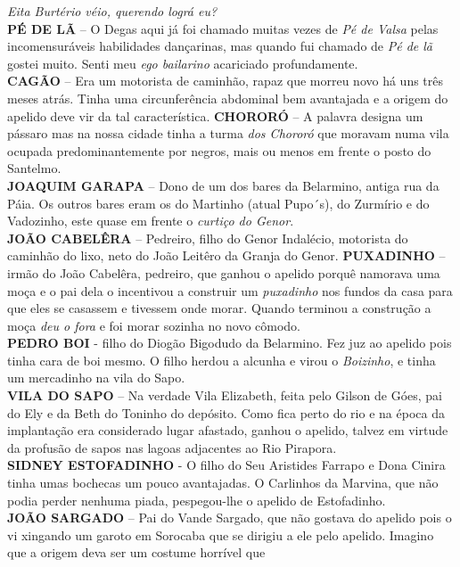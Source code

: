 \documentclass[12pt,brazil,]{book}
\begin{document}
\emph{Eita Burtério véio, querendo lográ eu?}\\
\textbf{PÉ DE LÃ} -- O Degas aqui já foi chamado muitas vezes de
\emph{Pé de Valsa} pelas incomensuráveis habilidades dançarinas, mas
quando fui chamado de \emph{Pé de lã} gostei muito. Senti meu \emph{ego
bailarino} acariciado profundamente.\\
\textbf{CAGÃO} -- Era um motorista de caminhão, rapaz que morreu novo há
uns três meses atrás. Tinha uma circunferência abdominal bem avantajada
e a origem do apelido deve vir da tal característica. \textbf{CHORORÓ}
-- A palavra designa um pássaro mas na nossa cidade tinha a turma
\emph{dos Chororó} que moravam numa vila ocupada predominantemente por
negros, mais ou menos em frente o posto do Santelmo.\\
\textbf{JOAQUIM GARAPA} -- Dono de um dos bares da Belarmino, antiga rua
da Páia. Os outros bares eram os do Martinho (atual Pupo´s), do Zurmírio
e do Vadozinho, este quase em frente o \emph{curtiço do Genor}.\\
\textbf{JOÃO CABELÊRA} -- Pedreiro, filho do Genor Indalécio, motorista
do caminhão do lixo, neto do João Leitêro da Granja do Genor.
\textbf{PUXADINHO} -- irmão do João Cabelêra, pedreiro, que ganhou o
apelido porquê namorava uma moça e o pai dela o incentivou a construir
um \emph{puxadinho} nos fundos da casa para que eles se casassem e
tivessem onde morar. Quando terminou a construção a moça \emph{deu o
fora} e foi morar sozinha no novo cômodo.\\
\textbf{PEDRO BOI} - filho do Diogão Bigodudo da Belarmino. Fez juz ao
apelido pois tinha cara de boi mesmo. O filho herdou a alcunha e virou o
\emph{Boizinho}, e tinha um mercadinho na vila do Sapo.\\
\textbf{VILA DO SAPO} -- Na verdade Vila Elizabeth, feita pelo Gilson de
Góes, pai do Ely e da Beth do Toninho do depósito. Como fica perto do
rio e na época da implantação era considerado lugar afastado, ganhou o
apelido, talvez em virtude da profusão de sapos nas lagoas adjacentes ao
Rio Pirapora.\\
\textbf{SIDNEY ESTOFADINHO} - O filho do Seu Aristides Farrapo e Dona
Cinira tinha umas bochecas um pouco avantajadas. O Carlinhos da Marvina,
que não podia perder nenhuma piada, pespegou-lhe o apelido de
Estofadinho.\\
\textbf{JOÃO SARGADO} -- Pai do Vande Sargado, que não gostava do
apelido pois o vi xingando um garoto em Sorocaba que se dirigiu a ele
pelo apelido. Imagino que a origem deva ser um costume horrível que
\end{document}
